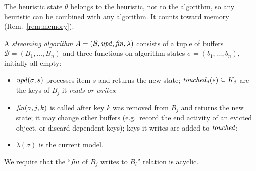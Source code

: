 The heuristic state $\theta$ belongs to the heuristic, not to the algorithm, so
any heuristic can be combined with any algorithm. It counts toward memory
(Rem.~\ref{rem:memory}).

\begin{definition}\label{def:algorithm}
A \emph{streaming algorithm} $A = (\mathcal{B}, \mathit{upd}, \mathit{fin}, \lambda)$ consists
of a tuple of buffers $\mathcal{B} = (B_1, \dots, B_n)$ and three functions on
algorithm states $\sigma = (b_1, \dots, b_n)$, initially all empty:
\begin{itemize}
  \item $\mathit{upd}(\sigma, s)$ processes item $s$ and returns the new state;
        $\mathit{touched}_j(s) \subseteq K_j$ are the keys of $B_j$ it \emph{reads or
        writes};
  \item $\mathit{fin}(\sigma, j, k)$ is called after key $k$ was removed from $B_j$ and
        returns the new state; it may change other buffers (e.g.\ record the
        end activity of an evicted object, or discard dependent keys);
        keys it writes are added to $\mathit{touched}$;
  \item $\lambda(\sigma)$ is the current model.
\end{itemize}
We require that the ``$\mathit{fin}$ of $B_j$ writes to $B_l$'' relation is acyclic.
\end{definition}

